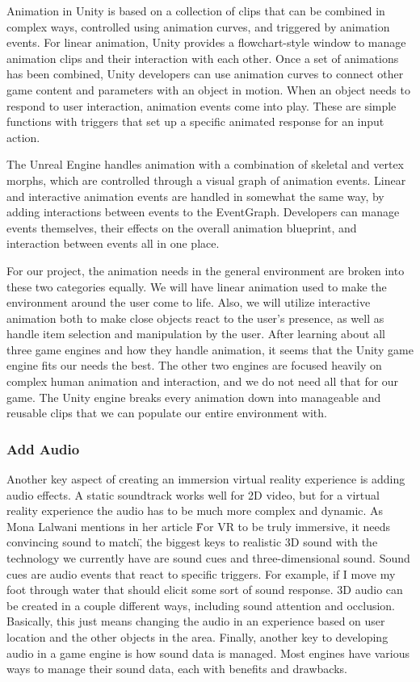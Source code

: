 \documentclass[10pt,journal,compsoc,onecolumn, draftclsnofoot]{IEEEtran}
\begin{document}
Animation in Unity is based on a collection of clips that can be combined in complex ways, controlled using animation curves, and triggered by animation events.
For linear animation, Unity provides a flowchart-style window to manage animation clips and their interaction with each other. \cite{unity_animation}
Once a set of animations has been combined, Unity developers can use animation curves to connect other game content and parameters with an object in motion. \cite{unity_animation_tutorial}
When an object needs to respond to user interaction, animation events come into play.  These are simple functions with triggers that set up a specific animated response for an input action. \cite{unity_animation}

The Unreal Engine handles animation with a combination of skeletal and vertex morphs, which are controlled through a visual graph of animation events.
Linear and interactive animation events are handled in somewhat the same way, by adding interactions between events to the EventGraph.
Developers can manage events themselves, their effects on the overall animation blueprint, and interaction between events all in one place. \cite{unreal_animation}

For our project, the animation needs in the general environment are broken into these two categories equally.
We will have linear animation used to make the environment around the user come to life.
Also, we will utilize interactive animation both to make close objects react to the user's presence, as well as handle item selection and manipulation by the user.
After learning about all three game engines and how they handle animation, it seems that the Unity game engine fits our needs the best.
The other two engines are focused heavily on complex human animation and interaction, and we do not need all that for our game.
The Unity engine breaks every animation down into manageable and reusable clips that we can populate our entire environment with.

\subsubsection{Add Audio}

Another key aspect of creating an immersion virtual reality experience is adding audio effects.
A static soundtrack works well for 2D video, but for a virtual reality experience the audio has to be much more complex and dynamic.
As Mona Lalwani mentions in her article \"For VR to be truly immersive, it needs convincing sound to match\", the biggest keys to realistic 3D sound with the technology we currently have are sound cues and three-dimensional sound. \cite{engadget_immersive_sound}
Sound cues are audio events that react to specific triggers.  For example, if I move my foot through water that should elicit some sort of sound response.
3D audio can be created in a couple different ways, including sound attention and occlusion.
Basically, this just means changing the audio in an experience based on user location and the other objects in the area.
Finally, another key to developing audio in a game engine is how sound data is managed.  Most engines have various ways to manage their sound data, each with benefits and drawbacks.
\end{document}
